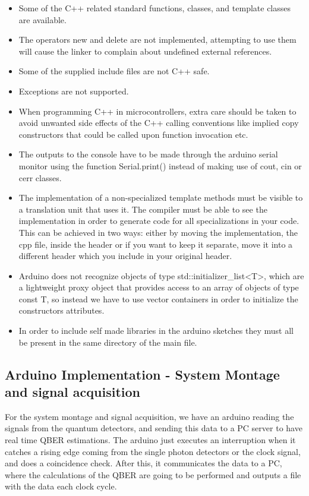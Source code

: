 \begin{refsection}
	\begin{itemize}
		\item Some of the C++ related standard functions, classes, and template classes are available.
		\item The operators new and delete are not implemented, attempting to use them will cause the linker to complain about undefined external references.
		\item Some of the supplied include files are not C++ safe.
		\item Exceptions are not supported.
		\item When programming C++ in microcontrollers, extra care should be taken to avoid unwanted side effects of the C++ calling conventions like implied copy constructors that could be called upon function invocation etc.
		\item The outputs to the console have to be made through the arduino serial monitor using the function Serial.print() instead of making use of cout, cin or cerr classes.
		\item  The implementation of a non-specialized template methods must be visible to a translation unit that uses it. The compiler must be able to see the implementation in order to generate code for all specializations in your code. This can be achieved in two ways: either by moving the implementation, the cpp file, inside the header or if you want to keep it separate, move it into a different header which you include in your original header.
		\item Arduino does not recognize objects of type std::initializer\_list<T>, which are a lightweight proxy object that provides access to an array of objects of type const T, so instead we have to use vector containers in order to initialize the constructors attributes.
		\item In order to include self made libraries in the arduino sketches they must all be present in the same directory of the main file.
		
	\end{itemize}
	
	\clearpage
	
	\subsection{Arduino Implementation - System Montage and signal acquisition}
	
	For the system montage and signal acquisition, we have an arduino reading the signals from the quantum detectors, and sending this data to a PC server to have real time QBER estimations. The arduino just executes an interruption when it catches a rising edge coming from the single photon detectors or the clock signal, and does a coincidence check. After this, it communicates the data to a PC, where the calculations of the QBER are going to be performed and outputs a file with the data each clock cycle. 
	

\end{refsection}
